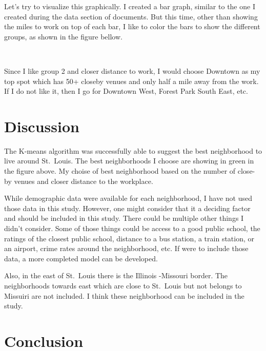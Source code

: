 \documentclass[11pt]{article}
\begin{document}
Let's try to visualize this graphically. I created a bar graph, similar to the one I created during the data section of documents. But this time, other than showing the miles to work on top of each bar, I like to color the bars to show the different groups, as shown in the figure bellow.



    \begin{center}
    \end{center}
    { \hspace*{\fill} \\}
    
    Since I like group 2 and closer distance to work, I would choose
Downtown as my top spot which has 50+ closeby venues and only half a
mile away from the work. If I do not like it, then I go for Downtown
West, Forest Park South East, etc.

    \hypertarget{discussion}{%
\section{Discussion}\label{discussion}}

The K-means algorithm was successfully able to suggest the best
neighborhood to live around St.~Louis. The best neighborhoods I choose
are showing in green in the figure above. My choise of best neighborhood
based on the number of close-by venues and closer distance to the
workplace.

While demographic data were available for each neighborhood, I have not
used those data in this study. However, one might consider that it a
deciding factor and should be included in this study. There could be
multiple other things I didn't consider. Some of those things could be
access to a good public school, the ratings of the closest public
school, distance to a bus station, a train station, or an airport, crime
rates around the neighborhood, etc. If were to include those data, a
more completed model can be developed.

Also, in the east of St.~Louis there is the Illinois -Missouri border.
The neighborhoods towards east which are close to St.~Louis but not
belongs to Missuiri are not included. I think these neighborhood can be
included in the study.

    \hypertarget{conclusion}{%
\section{Conclusion}\label{conclusion}}
\end{document}

